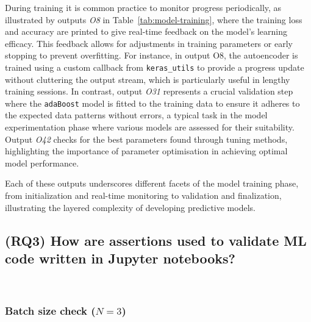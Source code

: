 During training it is common practice to monitor progress periodically, as illustrated by outputs \emph{O8} in Table~\ref{tab:model-training}, where the training loss and accuracy are printed to give real-time feedback on the model's learning efficacy. This feedback allows for adjustments in training parameters or early stopping to prevent overfitting. For instance, in output O8, the autoencoder is trained using a custom callback from \texttt{keras\_utils} to provide a progress update without cluttering the output stream, which is particularly useful in lengthy training sessions. In contrast, output \emph{O31} represents a crucial validation step where the \texttt{adaBoost} model is fitted to the training data to ensure it adheres to the expected data patterns without errors, a typical task in the model experimentation phase where various models are assessed for their suitability. Output \emph{O42} checks for the best parameters found through tuning methods, highlighting the importance of parameter optimisation in achieving optimal model performance.

Each of these outputs underscores different facets of the model training phase, from initialization and real-time monitoring to validation and finalization, illustrating the layered complexity of developing predictive models.


\subsection{(RQ3) How are assertions used to validate ML code written in Jupyter notebooks?}~\label{sec:result-rq2}


\subsubsection{Batch size check ($N = 3$)}

